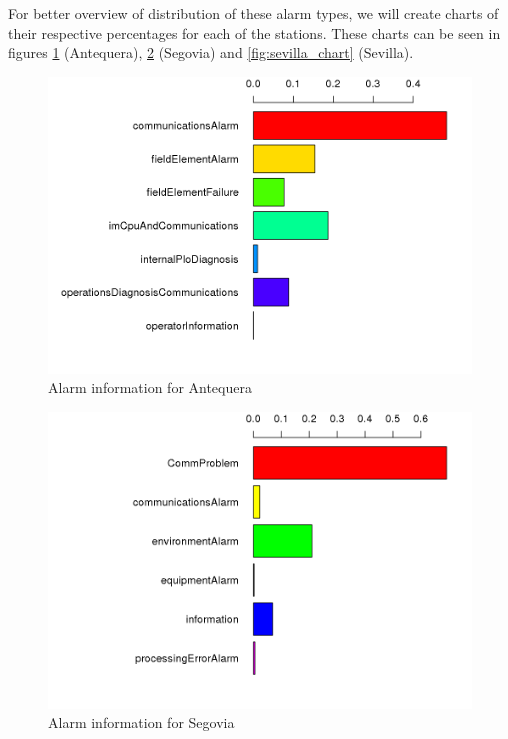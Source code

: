 For better overview of distribution of these alarm types, we will create charts of their respective percentages for each of the stations. These charts can be seen in figures \ref{fig:antequera_chart} (Antequera), \ref{fig:segovia_chart} (Segovia) and \ref{fig:sevilla_chart} (Sevilla).

\begin{figure}[htb]
 \centering
 \includegraphics[width=\textwidth]{./img/antequera_graph.png}
 \caption{Alarm information for Antequera}
 \label{fig:antequera_chart}
\end{figure}
\begin{figure}[htb]
 \centering
 \includegraphics[width=\textwidth]{./img/segovia_graph.png}
 \caption{Alarm information for Segovia}
 \label{fig:segovia_chart}
\end{figure}
